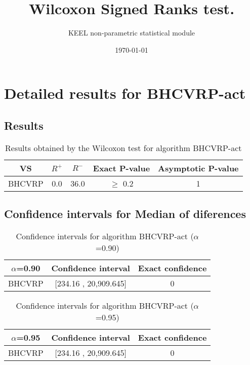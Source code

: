 \documentclass[a4paper,10pt]{article}
\title{Wilcoxon Signed Ranks test.}
\date{\today}
\author{KEEL non-parametric statistical module}
\begin{document}
\pagestyle{empty}
\maketitle
\thispagestyle{empty}



\section{Detailed results for BHCVRP-act}


\subsection{Results}

\begin{table}[!htp]
\centering\small
\begin{tabular}{
|c|c|c|c|c|}
\hline
 VS & $R^{+}$ & $R^{-}$ & Exact P-value & Asymptotic P-value \\ \hline 
BHCVRP & 0.0 & 36.0 & $\geq$ 0.2 & 1\\ \hline 

\end{tabular}
\caption{Results obtained by the Wilcoxon test for algorithm BHCVRP-act}
\end{table}

\subsection{Confidence intervals for Median of diferences}

\begin{table}[!htp]
\centering\small
\begin{tabular}{
|c|c|c|}
\hline
 $\alpha$=0.90 & Confidence interval & Exact confidence \\ \hline 
BHCVRP & [234.16 , 20,909.645] & 0\\ \hline 

\end{tabular}
\caption{Confidence intervals for algorithm BHCVRP-act ($\alpha$=0.90)}
\end{table}
\begin{table}[!htp]
\centering\small
\begin{tabular}{
|c|c|c|}
\hline
 $\alpha$=0.95 & Confidence interval & Exact confidence \\ \hline 
BHCVRP & [234.16 , 20,909.645] & 0\\ \hline 

\end{tabular}
\caption{Confidence intervals for algorithm BHCVRP-act ($\alpha$=0.95)}
\end{table}
\end{document}
